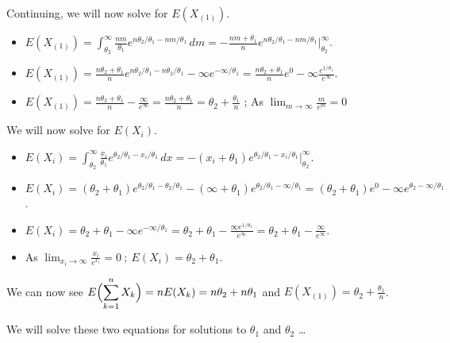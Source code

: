 \documentclass[12pt]{article}
\newcommand{\XB}{\color{black}}
\newcommand{\ds}{\displaystyle}
\begin{document}
\noindent
Continuing, we will now solve for $ E( X_{(1)} ) $. 

\begin{itemize}
    \item $ \ds E( X_{(1)} ) = \int_{\theta_{2}}^{\infty} \frac{nm}{\theta_{1}}e^{n\theta_{2} / \theta_{1} - nm / \theta_{1}} \, dm = - \frac{nm + \theta_{1}}{n} e^{n\theta_{2} / \theta_{1} - nm / \theta_{1}} \Big|_{\theta_{2}}^{\infty} $.
    \item $ \ds E( X_{(1)} ) = \frac{n\theta_{2} + \theta_{1}}{n} e^{n\theta_{2} / \theta_{1} - n\theta_{2} / \theta_{1}} - \infty e^{- \infty / \theta_{1}} = \frac{n\theta_{2} + \theta_{1}}{n} e^{0} - \infty \frac{e^{1 / \theta_{1}}}{e^{\infty}}  $.
    \item $ \ds E( X_{(1)} ) = \frac{n\theta_{2} + \theta_{1}}{n} - \frac{\infty}{e^{\infty}} = \frac{n\theta_{2} + \theta_{1}}{n} = \theta_{2} + \frac{\theta_{1}}{n} $ ; As $ \ds \lim_{m \to \infty} \frac{m}{e^{m}} = 0 $
\end{itemize} \XB

\noindent
We will now solve for $ E( X_{i} ) $. 

\begin{itemize}
    \item $ \ds E( X_{i} ) = \int_{\theta_{2}}^{\infty} \frac{x_{i}}{\theta_{1}}e^{\theta_{2} / \theta_{1} - x_{i} / \theta_{1}} \,dx = -(x_{i} + \theta_{1}) e^{\theta_{2} / \theta_{1} - x_{i} / \theta_{1}} \Big|_{\theta_2}^{\infty} $.
    \item $ \ds E( X_{i} ) = (\theta_{2} + \theta_{1}) e^{\theta_{2} / \theta_{1} - \theta_{2} / \theta_{1}} - (\infty + \theta_{1}) e^{\theta_{2} / \theta_{1} - \infty / \theta_{1}} = (\theta_{2} + \theta_{1}) e^{0} - \infty e^{\theta_{2} - \infty / \theta_{1}} $.
    \item $ \ds E( X_{i} ) = \theta_{2} + \theta_{1} - \infty e^{-\infty / \theta_{1}} = \theta_{2} + \theta_{1} - \frac{\infty e^{1 / \theta_{1}}}{e^{\infty}} = \theta_{2} + \theta_{1} - \frac{\infty}{e^{\infty}} $.
    \item As $ \ds \lim_{x_{i} \to \infty} \frac{x_{i}}{e^{x_{i}}} = 0 \ ; \ E( X_{i} ) = \theta_{2} + \theta_{1} $.
\end{itemize}

\noindent
We can now see $ \ds E\Bigl( \sum_{k=1}^{n} X_{k} \Bigr) = n E( X_{k} ) = n\theta_{2} + n\theta_{1} $ and $ \ds E( X_{(1)} ) = \theta_{2} + \frac{\theta_{1}}{n} $. \\
\newpage

\noindent
We will solve these two equations for solutions to $ \theta_{1} $ and $ \theta_{2} $ \dots
\end{document}
